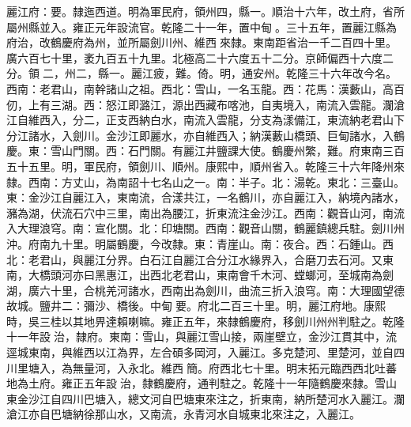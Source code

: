 \begin{pinyinscope}
麗江府：要。隸迤西道。明為軍民府，領州四，縣一。順治十六年，改土府，省所屬州縣並入。雍正元年設流官。乾隆二十一年，置中甸。三十五年，置麗江縣為府治，改鶴慶府為州，並所屬劍川州、維西來隸。東南距省治一千二百四十里。廣六百七十里，袤九百五十九里。北極高二十六度五十二分。京師偏西十六度二分。領二，州二，縣一。麗江疲，難。倚。明，通安州。乾隆三十六年改今名。西南：老君山，南幹諸山之祖。西北：雪山，一名玉龍。西：花馬：漢藪山，高百仞，上有三湖。西：怒江即潞江，源出西藏布喀池，自夷境入，南流入雲龍。瀾滄江自維西入，分二，正支西納白水，南流入雲龍，分支為漾備江，東流納老君山下分江諸水，入劍川。金沙江即麗水，亦自維西入；納漢藪山橋頭、巨甸諸水，入鶴慶。東：雪山門關。西：石門關。有麗江井鹽課大使。鶴慶州繁，難。府東南三百五十五里。明，軍民府，領劍川、順州。康熙中，順州省入。乾隆三十六年降州來隸。西南：方丈山，為南詔十七名山之一。南：半子。北：湯乾。東北：三臺山。東：金沙江自麗江入，東南流，合漾共江，一名鶴川，亦自麗江入，納境內諸水，瀦為湖，伏流石穴中三里，南出為腰江，折東流注金沙江。西南：觀音山河，南流入大理浪穹。南：宣化關。北：印塘關。西南：觀音山關，鶴麗鎮總兵駐。劍川州沖。府南九十里。明屬鶴慶，今改隸。東：青崖山。南：夜合。西：石鍾山。西北：老君山，與麗江分界。白石江自麗江合分江水緣界入，合磨刀去石河。又東南，大橋頭河亦曰黑惠江，出西北老君山，東南會千木河、螳螂河，至城南為劍湖，廣六十里，合桃羌河諸水，西南出為劍川，曲流三折入浪穹。南：大理國望德故城。鹽井二：彌沙、橋後。中甸要。府北二百三十里。明，麗江府地。康熙時，吳三桂以其地畀達賴喇嘛。雍正五年，來隸鶴慶府，移劍川州州判駐之。乾隆十一年設治，隸府。東南：雪山，與麗江雪山接，兩崖壁立，金沙江貫其中，流逕城東南，與維西以江為界，左合碩多岡河，入麗江。多克楚河、里楚河，並自四川里塘入，為無量河，入永北。維西簡。府西北七十里。明末拓元臨西西北吐蕃地為土府。雍正五年設治，隸鶴慶府，通判駐之。乾隆十一年隨鶴慶來隸。雪山東金沙江自四川巴塘入，總文河自巴塘東來注之，折東南，納所楚河水入麗江。瀾滄江亦自巴塘納徐那山水，又南流，永青河水自城東北來注之，入麗江。


\end{pinyinscope}
